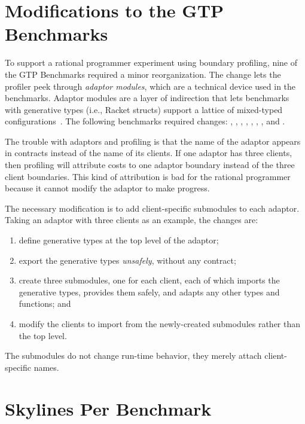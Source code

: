 \section{Modifications to the GTP Benchmarks} \label{s:adaptor-rewrite}

To support a rational programmer experiment using boundary profiling,
nine of the GTP Benchmarks required a minor reorganization.
The change lets the profiler peek through \emph{adaptor modules},
which are a technical device used in the benchmarks.
Adaptor modules are a layer of indirection that lets benchmarks with
generative types (i.e., Racket structs) support a lattice of mixed-typed
configurations~\cite{tfgnvf-popl-2016,gtnffvf-jfp-2019}.
The following benchmarks required changes:
, ,
, , , ,
, and .

The trouble with adaptors and profiling is that the
name of the adaptor appears in contracts instead of the name of its clients.
If one adaptor has three clients, then profiling will attribute costs to one
adaptor boundary instead of the three client boundaries.
This kind of attribution is bad for the rational programmer because
it cannot modify the adaptor to make progress.

The necessary modification is to add client-specific submodules to each adaptor.
Taking an adaptor with three clients as an example, the changes are:
\begin{enumerate}
  \item
    define generative types at the top level of the adaptor;
  \item
    export the generative types \emph{unsafely}, without any contract;
  \item
    create three submodules, one for each client, each of which imports
    the generative types, provides them safely, and adapts any other types and
    functions; and
  \item
    modify the clients to import from the newly-created submodules rather
    than the top level.
\end{enumerate}
%
The submodules do not change run-time behavior,
they merely attach client-specific names.


\section{Skylines Per Benchmark}
\label{s:bm-sky}

